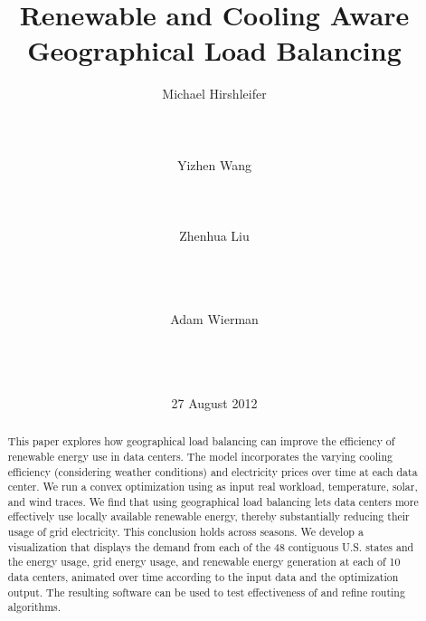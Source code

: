 \documentclass{acm_proc_article-sp}
\begin{document}
\title{Renewable and Cooling Aware Geographical Load Balancing}
\author{
%
%
\alignauthor
Michael Hirshleifer\\
	\\
	\\
	\\
\alignauthor
Yizhen Wang\\
	\\
	\\
	\\
\alignauthor
Zhenhua Liu\\
	\\
	\\
	\\
\and
\alignauthor
Adam Wierman\\
	\\
	\\
	\\
}

\date{27 August 2012}

\maketitle
\begin{abstract}
This paper explores how geographical load balancing can improve the efficiency of renewable energy use in data centers.
The model incorporates the varying cooling efficiency (considering weather conditions) and electricity prices over time at each data center.
We run a convex optimization using as input real workload, temperature, solar, and wind traces.
We find that using geographical load balancing lets data centers more effectively use locally available renewable energy, thereby substantially reducing their usage of grid electricity. This conclusion holds across seasons.
We develop a visualization that displays the demand from each of the 48 contiguous U.S. states and the energy usage, grid energy usage, and renewable energy generation at each of 10 data centers, animated over time according to the input data and the optimization output. The resulting software can be used to test effectiveness of and refine routing algorithms.
\end{abstract}
\end{document}
